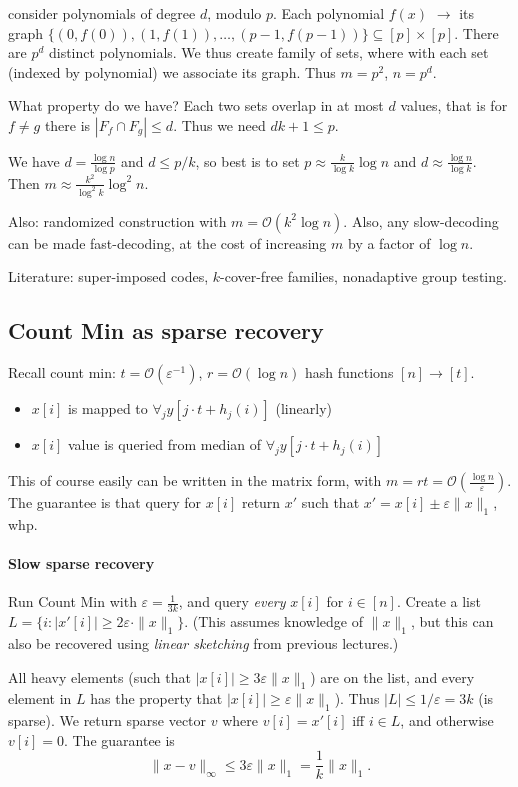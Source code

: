 \documentclass[11pt]{article}
\newcommand{\bigo}{\mathcal{O}}
\begin{document}
consider polynomials of degree $d$, modulo $p$. Each polynomial $f(x)$ $\to$ its graph $\{(0,f(0)), (1,f(1)), \ldots, (p-1,f(p-1))\} \subseteq [p] \times [p]$. There are $p^d$ distinct polynomials. We thus create family of sets, where with each set (indexed by polynomial) we associate its graph. Thus $m = p^2$, $n = p^d$.

What property do we have? Each two sets overlap in at most $d$ values, that is for $f \not = g$ there is $|F_f \cap F_g| \le d$. Thus we need $dk + 1 \le p$.

We have $d = \frac{\log n}{\log p}$ and $d \le p/k$, so best is to set $p \approx \frac{k}{\log k} \log n$ and $d \approx \frac{\log n}{\log k}$. Then $m \approx \frac{k^2}{\log^2 k} \log^2 n$.


Also: randomized construction with $m =\bigo(k^2 \log n)$. Also, any slow-decoding can be made fast-decoding, at the cost of increasing $m$ by a factor of $\log n$.

Literature: super-imposed codes, $k$-cover-free families, nonadaptive group testing.
\subsection{Count Min as sparse recovery}
Recall count min: $t = \bigo(\varepsilon^{-1})$, $r = \bigo(\log n)$ hash functions $[n] \to [t]$.
\begin{itemize}
\item $x[i]$ is mapped to $\forall_j y[j \cdot t + h_j(i)]$ (linearly)
\item $x[i]$ value is queried from median of $\forall_j y[j \cdot t + h_j(i)]$
\end{itemize}
This of course easily can be written in the matrix form, with $m = rt = \bigo(\frac{\log n}{\varepsilon})$. 
The guarantee is that query for $x[i]$ return $x'$ such that $x' = x[i] \pm \varepsilon \|x\|_1$, whp.

\paragraph{Slow sparse recovery}
Run Count Min with $\varepsilon = \frac{1}{3k}$, and query \emph{every} $x[i]$ for $i \in [n]$. Create a list $L = \{ i : |x'[i]| \ge  2\varepsilon \cdot \|x\|_1 \}$. (This assumes knowledge of $\|x\|_1$, but this can also be recovered using \emph{linear sketching} from previous lectures.)

All heavy elements (such that $|x[i]| \ge 3 \varepsilon \|x\|_1$) are on the list, and every element in $L$ has the property that $|x[i]| \ge \varepsilon \|x\|_1$). Thus $|L| \le 1/\varepsilon = 3k$ (is sparse). We return sparse vector $v$ where $v[i] = x'[i]$ iff $i \in L$, and otherwise $v[i] = 0$. The guarantee is
$$ \|x-v\|_\infty \le 3\varepsilon \|x\|_1 = \frac{1}{k} \|x\|_1.$$
\end{document}

